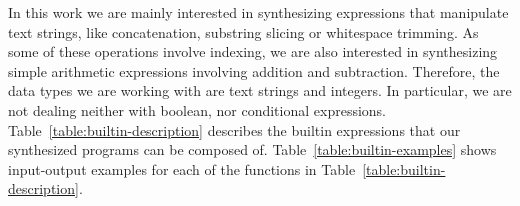 \begin{table*}[]
  \noindent{}
  \caption{Examples for the builtin functions used for synthesis.}
  \label{table:builtin-examples}
\end{table*}

In this work we are mainly interested in synthesizing expressions that
manipulate text strings, like concatenation, substring slicing or whitespace
trimming. As some of these operations involve indexing, we are also interested
in synthesizing simple arithmetic expressions involving addition and
subtraction. Therefore, the data types we are working with are text strings and
integers. In particular, we are not dealing neither with boolean, nor conditional
expressions. Table~\ref{table:builtin-description} describes the builtin
expressions that our synthesized programs can be composed of.
Table~\ref{table:builtin-examples} shows input-output examples for each of the
functions in Table~\ref{table:builtin-description}.

